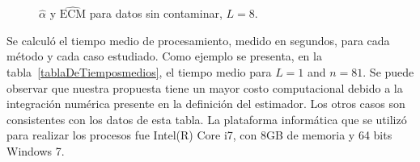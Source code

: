 \begin{figure}[H]
	\centering
	\caption{\small $\widehat{\alpha}$ y $\widehat{\text{ECM}}$ para datos sin contaminar, $L=8$.}
\end{figure}

Se calculó el tiempo medio de procesamiento, medido en segundos, para cada método y cada caso estudiado. Como  ejemplo se presenta, en la tabla~\ref{tablaDeTiemposmedios}, el tiempo medio para $L=1$ and $n=81$. Se puede observar que nuestra propuesta tiene un mayor costo computacional debido a la integración numérica presente en la definición del estimador. Los otros casos son consistentes con los datos de esta tabla. 
La plataforma informática que se utilizó para realizar los procesos fue Intel(R) Core i7, con 8GB de memoria y 64 bits Windows 7. 

